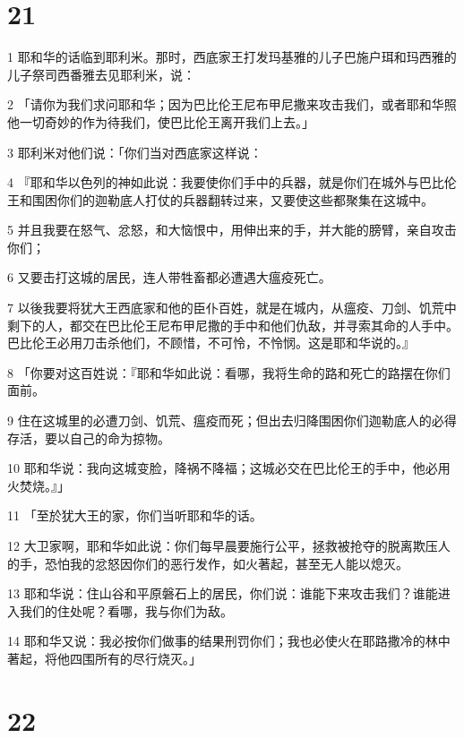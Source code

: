 \chapter{21}

\par 1 耶和华的话临到耶利米。那时，西底家王打发玛基雅的儿子巴施户珥和玛西雅的儿子祭司西番雅去见耶利米，说：
\par 2 「请你为我们求问耶和华；因为巴比伦王尼布甲尼撒来攻击我们，或者耶和华照他一切奇妙的作为待我们，使巴比伦王离开我们上去。」
\par 3 耶利米对他们说：「你们当对西底家这样说：
\par 4 『耶和华以色列的神如此说：我要使你们手中的兵器，就是你们在城外与巴比伦王和围困你们的迦勒底人打仗的兵器翻转过来，又要使这些都聚集在这城中。
\par 5 并且我要在怒气、忿怒，和大恼恨中，用伸出来的手，并大能的膀臂，亲自攻击你们；
\par 6 又要击打这城的居民，连人带牲畜都必遭遇大瘟疫死亡。
\par 7 以後我要将犹大王西底家和他的臣仆百姓，就是在城内，从瘟疫、刀剑、饥荒中剩下的人，都交在巴比伦王尼布甲尼撒的手中和他们仇敌，并寻索其命的人手中。巴比伦王必用刀击杀他们，不顾惜，不可怜，不怜悯。这是耶和华说的。』
\par 8 「你要对这百姓说：『耶和华如此说：看哪，我将生命的路和死亡的路摆在你们面前。
\par 9 住在这城里的必遭刀剑、饥荒、瘟疫而死；但出去归降围困你们迦勒底人的必得存活，要以自己的命为掠物。
\par 10 耶和华说：我向这城变脸，降祸不降福；这城必交在巴比伦王的手中，他必用火焚烧。』」
\par 11 「至於犹大王的家，你们当听耶和华的话。
\par 12 大卫家啊，耶和华如此说：你们每早晨要施行公平，拯救被抢夺的脱离欺压人的手，恐怕我的忿怒因你们的恶行发作，如火著起，甚至无人能以熄灭。
\par 13 耶和华说：住山谷和平原磐石上的居民，你们说：谁能下来攻击我们？谁能进入我们的住处呢？看哪，我与你们为敌。
\par 14 耶和华又说：我必按你们做事的结果刑罚你们；我也必使火在耶路撒冷的林中著起，将他四围所有的尽行烧灭。」

\chapter{22}

